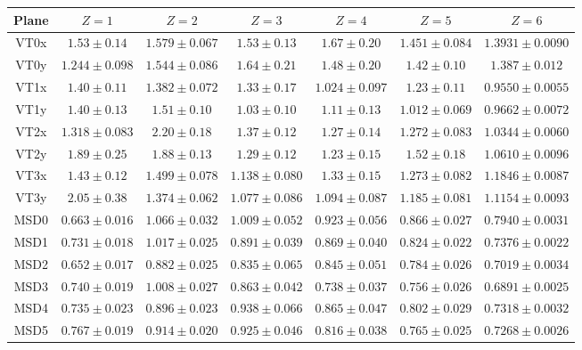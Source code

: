 \begin{table}
	\centering
	\normalsize{%
		\begin{tabular}{ccccccc}
			\hline
			\textbf{Plane} & \textbf{$Z=1$} & \textbf{$Z=2$} & \textbf{$Z=3$} & \textbf{$Z=4$} & \textbf{$Z=5$} & \textbf{$Z=6$} \\
			\hline
			VT0x & $1.53 \pm 0.14$ & $1.579 \pm 0.067$ & $1.53 \pm 0.13$ & $1.67 \pm 0.20$ & $1.451 \pm 0.084$ & $1.3931 \pm 0.0090$\\
			VT0y & $1.244 \pm 0.098$ & $1.544 \pm 0.086$ & $1.64 \pm 0.21$ & $1.48 \pm 0.20$ & $1.42 \pm 0.10$ & $1.387 \pm 0.012$\\
			VT1x & $1.40 \pm 0.11$ & $1.382 \pm 0.072$ & $1.33 \pm 0.17$ & $1.024 \pm 0.097$ & $1.23 \pm 0.11$ & $0.9550 \pm 0.0055$\\
			VT1y & $1.40 \pm 0.13$ & $1.51 \pm 0.10$ & $1.03 \pm 0.10$ & $1.11 \pm 0.13$ & $1.012 \pm 0.069$ & $0.9662 \pm 0.0072$\\
			VT2x & $1.318 \pm 0.083$ & $2.20 \pm 0.18$ & $1.37 \pm 0.12$ & $1.27 \pm 0.14$ & $1.272 \pm 0.083$ & $1.0344 \pm 0.0060$\\
			VT2y & $1.89 \pm 0.25$ & $1.88 \pm 0.13$ & $1.29 \pm 0.12$ & $1.23 \pm 0.15$ & $1.52 \pm 0.18$ & $1.0610 \pm 0.0096$\\
			VT3x & $1.43 \pm 0.12$ & $1.499 \pm 0.078$ & $1.138 \pm 0.080$ & $1.33 \pm 0.15$ & $1.273 \pm 0.082$ & $1.1846 \pm 0.0087$\\
			VT3y & $2.05 \pm 0.38$ & $1.374 \pm 0.062$ & $1.077 \pm 0.086$ & $1.094 \pm 0.087$ & $1.185 \pm 0.081$ & $1.1154 \pm 0.0093$\\
			MSD0 & $0.663 \pm 0.016$ & $1.066 \pm 0.032$ & $1.009 \pm 0.052$ & $0.923 \pm 0.056$ & $0.866 \pm 0.027$ & $0.7940 \pm 0.0031$\\
			MSD1 & $0.731 \pm 0.018$ & $1.017 \pm 0.025$ & $0.891 \pm 0.039$ & $0.869 \pm 0.040$ & $0.824 \pm 0.022$ & $0.7376 \pm 0.0022$\\
			MSD2 & $0.652 \pm 0.017$ & $0.882 \pm 0.025$ & $0.835 \pm 0.065$ & $0.845 \pm 0.051$ & $0.784 \pm 0.026$ & $0.7019 \pm 0.0034$\\
			MSD3 & $0.740 \pm 0.019$ & $1.008 \pm 0.027$ & $0.863 \pm 0.042$ & $0.738 \pm 0.037$ & $0.756 \pm 0.026$ & $0.6891 \pm 0.0025$\\
			MSD4 & $0.735 \pm 0.023$ & $0.896 \pm 0.023$ & $0.938 \pm 0.066$ & $0.865 \pm 0.047$ & $0.802 \pm 0.029$ & $0.7318 \pm 0.0032$\\
			MSD5 & $0.767 \pm 0.019$ & $0.914 \pm 0.020$ & $0.925 \pm 0.046$ & $0.816 \pm 0.038$ & $0.765 \pm 0.025$ & $0.7268 \pm 0.0026$\\

\end{tabular}}
\end{table}
